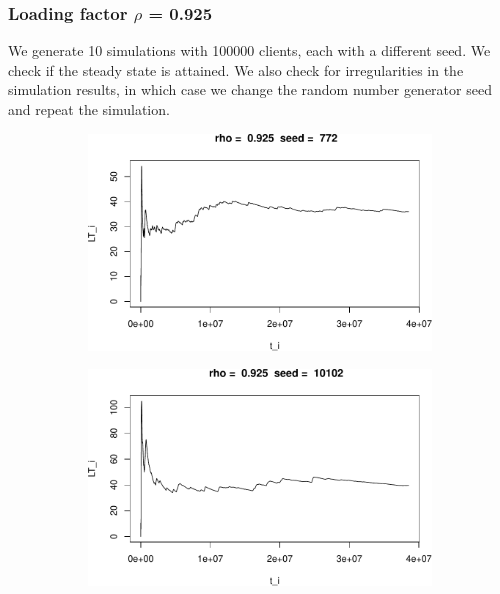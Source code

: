 \documentclass[]{article}
\begin{document}
\subsubsection{\texorpdfstring{Loading factor \(\rho\) =
0.925}{Loading factor \textbackslash{}rho = 0.925}}\label{loading-factor-rho-0.925}

We generate 10 simulations with 100000 clients, each with a different
seed. We check if the steady state is attained. We also check for
irregularities in the simulation results, in which case we change the
random number generator seed and repeat the simulation.


\begin{figure}[h!]
\begin{subfigure}[b]{.55\linewidth}

\includegraphics[width=\linewidth]{003_files/figure-latex/unnamed-chunk-22-1.pdf}
\end{subfigure}\hfill
\begin{subfigure}[b]{.55\linewidth}
\includegraphics[width=\linewidth]{003_files/figure-latex/unnamed-chunk-22-2.pdf}
\end{subfigure}\vfill
\end{figure}
\end{document}
